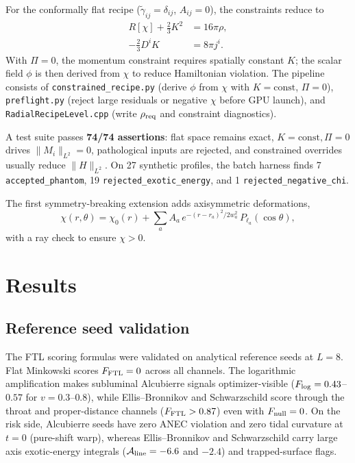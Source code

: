 \documentclass[twocolumn,floatfix,aps,prd,nofootinbib]{revtex4-2}
\begin{document}
For the conformally flat recipe ($\tilde\gamma_{ij}=\delta_{ij}$, $A_{ij}=0$), the constraints reduce to
\begin{align}
    R[\chi] + \tfrac{2}{3}K^2 &= 16\pi\rho, \label{eq:ham_recipe} \\
    -\tfrac{2}{3}D^i K &= 8\pi j^i. \label{eq:mom_recipe}
\end{align}
With $\Pi=0$, the momentum constraint requires spatially constant $K$; the scalar field $\phi$ is then derived from $\chi$ to reduce Hamiltonian violation.  The pipeline consists of \texttt{constrained\_recipe.py} (derive $\phi$ from $\chi$ with $K=\mathrm{const}$, $\Pi=0$), \texttt{preflight.py} (reject large residuals or negative $\chi$ before GPU launch), and \texttt{RadialRecipeLevel.cpp} (write $\rho_{\rm req}$ and constraint diagnostics).

A test suite passes \textbf{74/74 assertions}: flat space remains exact, $K=\mathrm{const},\Pi=0$ drives $\|M_i\|_{L^2}=0$, pathological inputs are rejected, and constrained overrides usually reduce $\|H\|_{L^2}$.  On 27 synthetic profiles, the batch harness finds 7 \texttt{accepted\_phantom}, 19 \texttt{rejected\_exotic\_energy}, and 1 \texttt{rejected\_negative\_chi}.

The first symmetry-breaking extension adds axisymmetric deformations,
\begin{equation}
    \chi(r,\theta) = \chi_0(r) + \sum_a A_a\,e^{-(r-r_a)^2/2w_a^2}\,P_{\ell_a}(\cos\theta),
\end{equation}
with a ray check to ensure $\chi>0$.

\section{Results}
\label{sec:results}

\subsection{Reference seed validation}

The FTL scoring formulas were validated on analytical reference seeds at $L=8$.  Flat Minkowski scores $F_{\rm FTL}=0$ across all channels.  The logarithmic amplification makes subluminal Alcubierre signals optimizer-visible ($F_{\rm log}=0.43$--$0.57$ for $v=0.3$--$0.8$), while Ellis--Bronnikov and Schwarzschild score through the throat and proper-distance channels ($F_{\rm FTL}>0.87$) even with $F_{\rm null}=0$.  On the risk side, Alcubierre seeds have zero ANEC violation and zero tidal curvature at $t=0$ (pure-shift warp), whereas Ellis--Bronnikov and Schwarzschild carry large axis exotic-energy integrals ($\mathcal{A}_{\rm line}=-6.6$ and $-2.4$) and trapped-surface flags.
\end{document}
